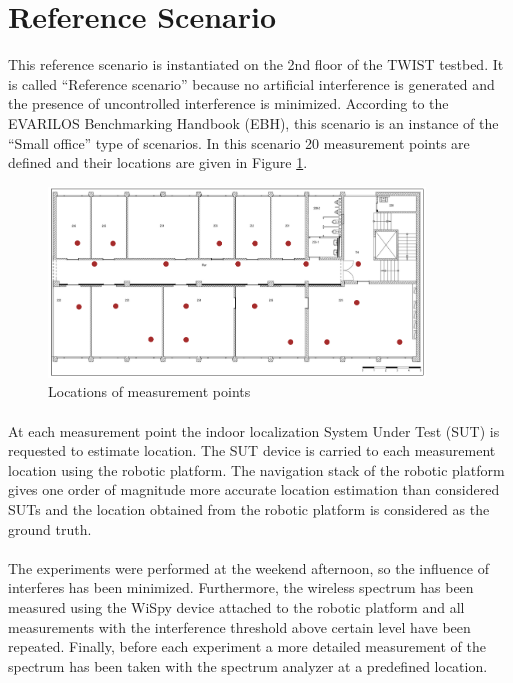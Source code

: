 \documentclass[11pt,a4paper,headinclude,footinclude,chapterprefix=on]{scrreprt}
\begin{document}
\section{Reference Scenario}\label{scene:ref} This reference scenario is instantiated on the 2nd floor of the TWIST testbed. It is called “Reference scenario” because no artificial interference is generated and the presence of uncontrolled interference is minimized. According to the EVARILOS Benchmarking Handbook (EBH), this scenario is an instance of the “Small office” type of scenarios. In this scenario 20 measurement points are defined and their locations are given in Figure \ref{fig:floor}. 
\begin{figure}
	[!h] \centering 
	\includegraphics[width=100mm]{Images/floor} \caption{Locations of measurement points} \label{fig:floor} 
\end{figure}

\paragraph{} At each measurement point the indoor localization System Under Test (SUT) is requested to estimate location. The SUT device is carried to each measurement location using the robotic platform. The navigation stack of the robotic platform gives one order of magnitude more accurate location estimation than considered SUTs and the location obtained from the robotic platform is considered as the ground truth.

\paragraph{} The experiments were performed at the weekend afternoon, so the influence of interferes has been minimized. Furthermore, the wireless spectrum has been measured using the WiSpy device attached to the robotic platform and all measurements with the interference threshold above certain level have been repeated. Finally, before each experiment a more detailed measurement of the spectrum has been taken with the spectrum analyzer at a predefined location.
\end{document}
